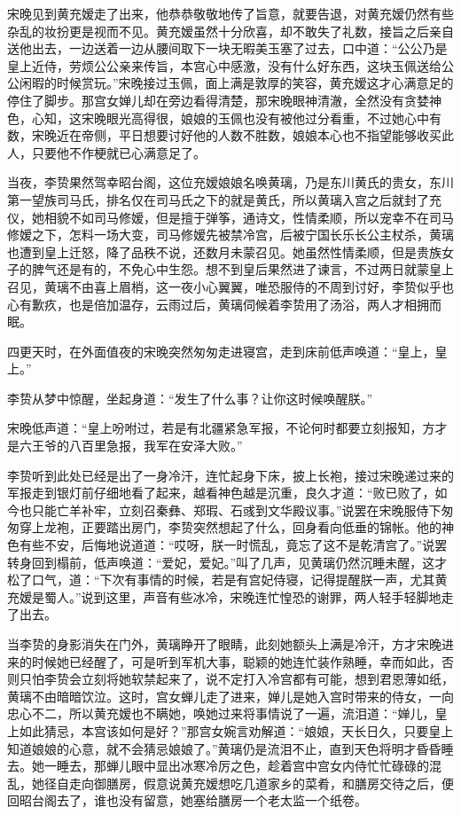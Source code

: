 宋晚见到黄充嫒走了出来，他恭恭敬敬地传了旨意，就要告退，对黄充嫒仍然有些杂乱的妆扮更是视而不见。黄充嫒虽然十分欣喜，却不敢失了礼数，接旨之后亲自送他出去，一边送着一边从腰间取下一块无暇美玉塞了过去，口中道：“公公乃是皇上近侍，劳烦公公亲来传旨，本宫心中感激，没有什么好东西，这块玉佩送给公公闲暇的时候赏玩。”宋晚接过玉佩，面上满是敦厚的笑容，黄充嫒这才心满意足的停住了脚步。那宫女婵儿却在旁边看得清楚，那宋晚眼神清澈，全然没有贪婪神色，心知，这宋晚眼光高得很，娘娘的玉佩也没有被他过分看重，不过她心中有数，宋晚近在帝侧，平日想要讨好他的人数不胜数，娘娘本心也不指望能够收买此人，只要他不作梗就已心满意足了。

当夜，李贽果然驾幸昭台阁，这位充嫒娘娘名唤黄璃，乃是东川黄氏的贵女，东川第一望族司马氏，排名仅在司马氏之下的就是黄氏，所以黄璃入宫之后就封了充仪，她相貌不如司马修嫒，但是擅于弹筝，通诗文，性情柔顺，所以宠幸不在司马修嫒之下，怎料一场大变，司马修嫒先被禁冷宫，后被宁国长乐长公主杖杀，黄璃也遭到皇上迁怒，降了品秩不说，还数月未蒙召见。她虽然性情柔顺，但是贵族女子的脾气还是有的，不免心中生怨。想不到皇后果然进了谏言，不过两日就蒙皇上召见，黄璃不由喜上眉梢，这一夜小心翼翼，唯恐服侍的不周到讨好，李贽似乎也心有歉疚，也是倍加温存，云雨过后，黄璃伺候着李贽用了汤浴，两人才相拥而眠。

四更天时，在外面值夜的宋晚突然匆匆走进寝宫，走到床前低声唤道：“皇上，皇上。”

李贽从梦中惊醒，坐起身道：“发生了什么事？让你这时候唤醒朕。”

宋晚低声道：“皇上吩咐过，若是有北疆紧急军报，不论何时都要立刻报知，方才是六王爷的八百里急报，我军在安泽大败。”

李贽听到此处已经是出了一身冷汗，连忙起身下床，披上长袍，接过宋晚递过来的军报走到银灯前仔细地看了起来，越看神色越是沉重，良久才道：“败已败了，如今也只能亡羊补牢，立刻召秦彝、郑瑕、石彧到文华殿议事。”说罢在宋晚服侍下匆匆穿上龙袍，正要踏出房门，李贽突然想起了什么，回身看向低垂的锦帐。他的神色有些不安，后悔地说道道：“哎呀，朕一时慌乱，竟忘了这不是乾清宫了。”说罢转身回到榻前，低声唤道：“爱妃，爱妃。”叫了几声，见黄璃仍然沉睡未醒，这才松了口气，道：“下次有事情的时候，若是有宫妃侍寝，记得提醒朕一声，尤其黄充嫒是蜀人。”说到这里，声音有些冰冷，宋晚连忙惶恐的谢罪，两人轻手轻脚地走了出去。

当李贽的身影消失在门外，黄璃睁开了眼睛，此刻她额头上满是冷汗，方才宋晚进来的时候她已经醒了，可是听到军机大事，聪颖的她连忙装作熟睡，幸而如此，否则只怕李贽会立刻将她软禁起来了，说不定打入冷宫都有可能，想到君恩薄如纸，黄璃不由暗暗饮泣。这时，宫女蝉儿走了进来，婵儿是她入宫时带来的侍女，一向忠心不二，所以黄充嫒也不瞒她，唤她过来将事情说了一遍，流泪道：“婵儿，皇上如此猜忌，本宫该如何是好？”那宫女婉言劝解道：“娘娘，天长日久，只要皇上知道娘娘的心意，就不会猜忌娘娘了。”黄璃仍是流泪不止，直到天色将明才昏昏睡去。她一睡去，那蝉儿眼中显出冰寒冷厉之色，趁着宫中宫女内侍忙忙碌碌的混乱，她径自走向御膳房，假意说黄充嫒想吃几道家乡的菜肴，和膳房交待之后，便回昭台阁去了，谁也没有留意，她塞给膳房一个老太监一个纸卷。

